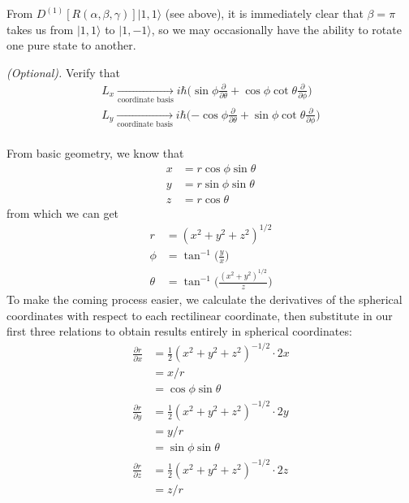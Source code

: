\documentclass[../principles-of-quantum-mechanics.tex]{subfiles}
\begin{document}
\begin{questions}
\begin{solution}
			From $D^{(1)}[R(\alpha, \beta, \gamma)]|1, 1\rangle$ (see above), it is immediately clear that $\beta = \pi$ takes us from $|1, 1\rangle$ to $|1, {-1}\rangle$, so we may occasionally have the ability to rotate one pure state to another.
		\end{solution}
		
		\question \textit{(Optional).} Verify that
		\begin{gather*}
			L_x \xrightarrow[\text{coordinate basis}]{} i\hbar\Big(\sin\phi\frac{\partial}{\partial\theta} + \cos\phi\cot\theta\frac{\partial}{\partial\phi}\Big) \\
			L_y \xrightarrow[\text{coordinate basis}]{} i\hbar\Big({-\cos\phi}\frac{\partial}{\partial\theta} + \sin\phi\cot\theta\frac{\partial}{\partial\phi}\Big) \\
		\end{gather*}
		\begin{solution}
			From basic geometry, we know that
			\begin{align*}
				x &= r\cos\phi\sin\theta \\
				y &= r\sin\phi\sin\theta \\
				z &= r\cos\theta
			\end{align*}
			from which we can get
			\begin{align*}
				r &= (x^2 + y^2 + z^2)^{1/2} \\
				\phi &= \tan^{-1}\big(\tfrac{y}{x}\big) \\
				\theta &= \tan^{-1}\Big(\tfrac{(x^2 + y^2)^{1/2}}{z}\Big)
			\end{align*}
			To make the coming process easier, we calculate the derivatives of the spherical coordinates with respect to each rectilinear coordinate, then substitute in our first three relations to obtain results entirely in spherical coordinates:
			\begin{align*}
				\frac{\partial r}{\partial x} &= \frac{1}{2}(x^2 + y^2 + z^2)^{-1/2}\cdot 2x \\
				&= x/r \\
				&= \cos\phi\sin\theta \\
				\frac{\partial r}{\partial y} &= \frac{1}{2}(x^2 + y^2 + z^2)^{-1/2}\cdot 2y \\
				&= y/r \\
				&= \sin\phi\sin\theta\\
				\frac{\partial r}{\partial z} &= \frac{1}{2}(x^2 + y^2 + z^2)^{-1/2}\cdot 2z\\
				&= z/r \\

\end{align*}
\end{solution}
\end{questions}
\end{document}
